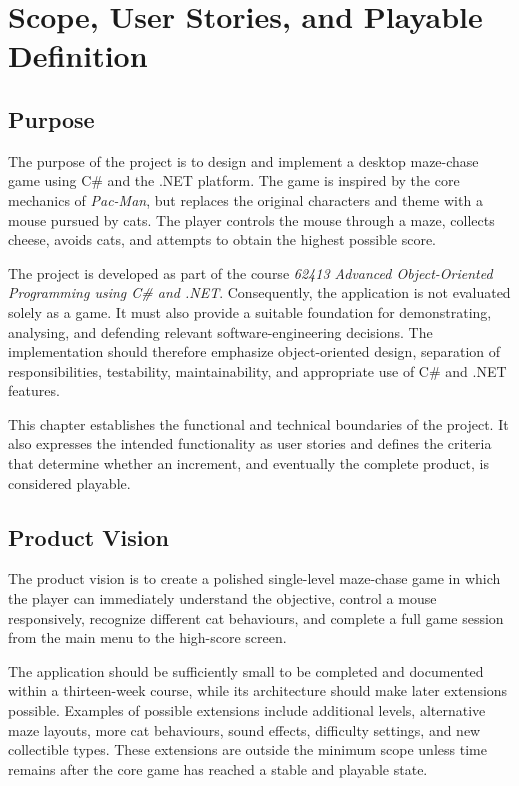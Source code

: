 \chapter{Scope, User Stories, and Playable Definition}
\label{chap:scope}

\section{Purpose}

The purpose of the project is to design and implement a desktop maze-chase game using C\# and the .NET platform. The game is inspired by the core mechanics of \emph{Pac-Man}, but replaces the original characters and theme with a mouse pursued by cats. The player controls the mouse through a maze, collects cheese, avoids cats, and attempts to obtain the highest possible score.

The project is developed as part of the course \emph{62413 Advanced Object-Oriented Programming using C\# and .NET}. Consequently, the application is not evaluated solely as a game. It must also provide a suitable foundation for demonstrating, analysing, and defending relevant software-engineering decisions. The implementation should therefore emphasize object-oriented design, separation of responsibilities, testability, maintainability, and appropriate use of C\# and .NET features.

This chapter establishes the functional and technical boundaries of the project. It also expresses the intended functionality as user stories and defines the criteria that determine whether an increment, and eventually the complete product, is considered playable.

\section{Product Vision}

The product vision is to create a polished single-level maze-chase game in which the player can immediately understand the objective, control a mouse responsively, recognize different cat behaviours, and complete a full game session from the main menu to the high-score screen.

The application should be sufficiently small to be completed and documented within a thirteen-week course, while its architecture should make later extensions possible. Examples of possible extensions include additional levels, alternative maze layouts, more cat behaviours, sound effects, difficulty settings, and new collectible types. These extensions are outside the minimum scope unless time remains after the core game has reached a stable and playable state.

